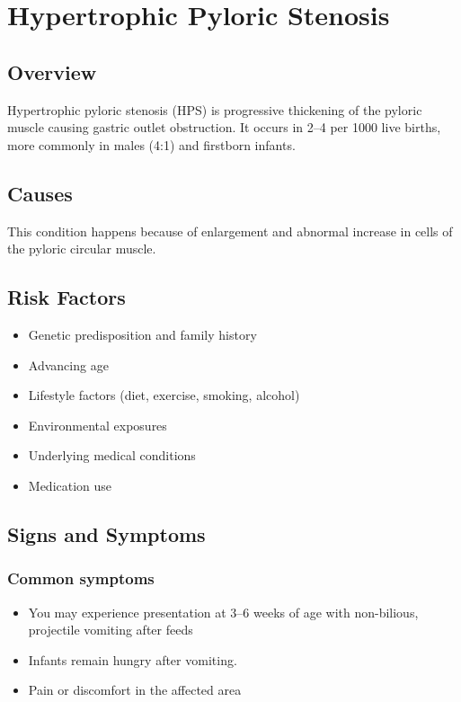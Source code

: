 \chapter{Hypertrophic Pyloric Stenosis}
\label{sec:Hypertrophic Pyloric Stenosis}

\section{Overview}
Hypertrophic pyloric stenosis (HPS) is progressive thickening of the pyloric muscle causing gastric outlet obstruction. It occurs in 2--4 per 1000 live births, more commonly in males (4:1) and firstborn infants.
\section{Causes}
This condition happens because of enlargement and abnormal increase in cells of the pyloric circular muscle.     
\section{Risk Factors}

\begin{itemize}[noitemsep]
  \item Genetic predisposition and family history
  \item Advancing age
  \item Lifestyle factors (diet, exercise, smoking, alcohol)
  \item Environmental exposures
  \item Underlying medical conditions
  \item Medication use
\end{itemize}
\section{Signs and Symptoms}

\subsection{Common symptoms}
\begin{itemize}[noitemsep]
  \item You may experience presentation at 3--6 weeks of age with non-bilious, projectile vomiting after feeds
  \item Infants remain hungry after vomiting.
  \item Pain or discomfort in the affected area
  \end{itemize}

